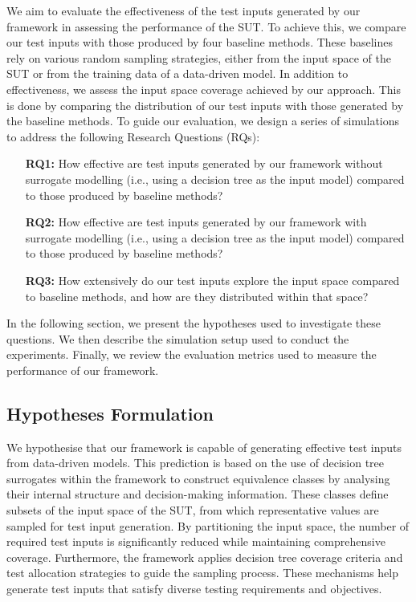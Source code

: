 \documentclass[
]{ceurart}
\theoremstyle{definition}
\begin{document}
We aim to evaluate the effectiveness of the test inputs generated by our framework in assessing the performance of the SUT. To achieve this, we compare our test inputs with those produced by four baseline methods. These baselines rely on various random sampling strategies, either from the input space of the SUT or from the training data of a data-driven model. In addition to effectiveness, we assess the input space coverage achieved by our approach. This is done by comparing the distribution of our test inputs with those generated by the baseline methods. To guide our evaluation, we design a series of simulations to address the following Research Questions (RQs):
\begin{enumerate}[align=left]
\item[\textbf{RQ1:}] How effective are test inputs generated by our framework without surrogate modelling (i.e., using a decision tree as the input model) compared to those produced by baseline methods?
\item[\textbf{RQ2:}] How effective are test inputs generated by our framework with surrogate modelling (i.e., using a decision tree as the input model) compared to those produced by baseline methods?
\item[\textbf{RQ3:}] How extensively do our test inputs explore the input space compared to baseline methods, and how are they distributed within that space?
\end{enumerate}

In the following section, we present the hypotheses used to investigate these questions. We then describe the simulation setup used to conduct the experiments. Finally, we review the evaluation metrics used to measure the performance of our framework.

\subsection{Hypotheses Formulation}

We hypothesise that our framework is capable of generating effective test inputs from data-driven models. This prediction is based on the use of decision tree surrogates within the framework to construct equivalence classes by analysing their internal structure and decision-making information. These classes define subsets of the input space of the SUT, from which representative values are sampled for test input generation. By partitioning the input space, the number of required test inputs is significantly reduced while maintaining comprehensive coverage. Furthermore, the framework applies decision tree coverage criteria and test allocation strategies to guide the sampling process. These mechanisms help generate test inputs that satisfy diverse testing requirements and objectives.
\end{document}
